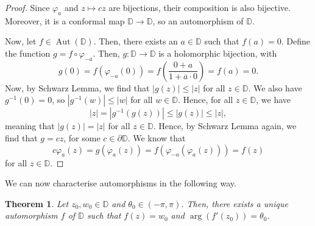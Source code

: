 \documentclass[a4paper, openany]{memoir}
\theoremstyle{definition}
\theoremstyle{plain}
\newtheorem{theorem}[definition]{Theorem}
\begin{document}
    \begin{proof}
        Since $\varphi_a$ and $z \mapsto cz$ are bijections, their composition is also bijective. Moreover, it is a conformal map $\mathbb{D} \to \mathbb{D}$, so an automorphism of $\mathbb{D}$. 
        
        Now, let $f \in \operatorname{Aut}(\mathbb{D})$. Then, there exists an $a \in \mathbb{D}$ such that $f(a) = 0$. Define the function $g = f \circ \varphi_{-a}$. Then, $g \colon \mathbb{D} \to \mathbb{D}$ is a holomorphic bijection, with 
        \[g(0) = f(\varphi_{-a}(0)) = f \left(\frac{0 + a}{1 + \overline{a} \cdot 0}\right) = f(a) = 0.\]
        Now, by Schwarz Lemma, we find that $|g(z)| \leq |z|$ for all $z \in \mathbb{D}$. We also have $g^{-1}(0) = 0$, so $|g^{-1}(w)| \leq |w|$ for all $w \in \mathbb{D}$. Hence, for all $z \in \mathbb{D}$, we have
        \[|z| = |g^{-1}(g(z))| \leq |g(z)| \leq |z|,\]
        meaning that $|g(z)| = |z|$ for all $z \in \mathbb{D}$. Hence, by Schwarz Lemma again, we find that $g = cz$, for some $c \in \partial \mathbb{D}$. We know that
        \[c\varphi_a(z) = g(\varphi_a(z)) = f(\varphi_{-a}(\varphi_a(z))) = f(z)\]
        for all $z \in \mathbb{D}$.
    \end{proof}
    We can now characterise automorphisms in the following way.
    \begin{theorem}
        Let $z_0, w_0 \in \mathbb{D}$ and $\theta_0 \in (-\pi, \pi)$. Then, there exists a unique automorphism $f$ of $\mathbb{D}$ such that $f(z) = w_0$ and $\arg(f'(z_0)) = \theta_0$.
    \end{theorem}
\end{document}
